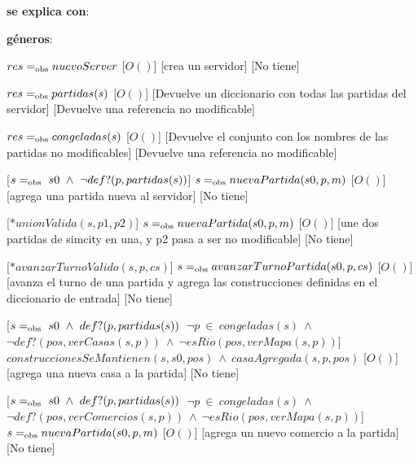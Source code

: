 \begin{Interfaz}
    \textbf{se explica con}: 

    \textbf{géneros}: 


    {$res =_{\mathrm{obs}} nuevoServer$}
    [$O()$]
    [crea un servidor]
    [No tiene]

    {$res =_{\mathrm{obs}} partidas(s)$}
    [$O()$]
    [Devuelve un diccionario con todas las partidas del servidor]
    [Devuelve una referencia no modificable]

    {$res =_{\mathrm{obs}} congeladas(s)$}
    [$O()$]
    [Devuelve el conjunto con los nombres de las partidas no modificables]
    [Devuelve una referencia no modificable]

    [$s =_{\mathrm{obs}}\ s0\ \wedge\ \lnot def?(p, partidas(s))$]
    {$s =_{\mathrm{obs}} nuevaPartida(s0, p, m)$}
    [$O()$]
    [agrega una partida nueva al servidor]
    [No tiene]

    [$*unionValida(s, p1, p2)$]
    {$s =_{\mathrm{obs}} nuevaPartida(s0, p, m)$}
    [$O()$]
    [une dos partidas de simcity en una, y p2 pasa a ser no modificable]
    [No tiene]

    [$*avanzarTurnoValido(s, p, cs)$]
    {$s =_{\mathrm{obs}} avanzarTurnoPartida(s0, p, cs)$}
    [$O()$]
    [avanza el turno de una partida y agrega las construcciones definidas en el diccionario de entrada]
    [No tiene]

    [$
        s \igobs\ s0\ \wedge\ def?(p, partidas(s))\ $\yluego$\ \lnot p\ \in\ congeladas(s)\ \wedge\ $\\$
        $\tab\tab$ \lnot def?(pos, verCasas(s, p))\ \wedge\ \lnot esRio(pos, verMapa(s, p))
    $]
    {$construccionesSeMantienen(s, s0, pos)\ \wedge\ casaAgregada(s, p, pos)$}
    [$O()$]
    [agrega una nueva casa a la partida]
    [No tiene]

    \pagebreak
    
    [$
        s \igobs\ s0\ \wedge\ def?(p, partidas(s))\ $\yluego$\ \lnot p\ \in\ congeladas(s)\ \wedge\ $\\$
        $\tab\tab$ \lnot def?(pos, verComercios(s, p))\ \wedge\ \lnot esRio(pos, verMapa(s, p))
    $]
    {$s =_{\mathrm{obs}} nuevaPartida(s0, p, m)$}
    [$O()$]
    [agrega un nuevo comercio a la partida]
    [No tiene]
    

\end{Interfaz}

